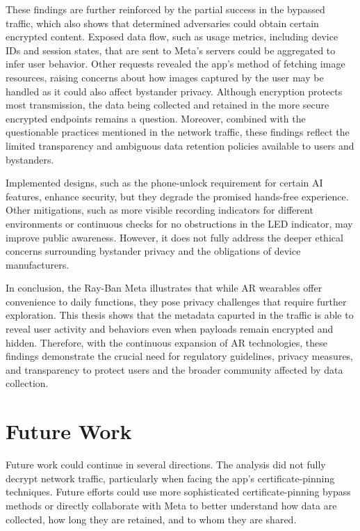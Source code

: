 These findings are further reinforced by the partial success in the bypassed traffic, which also shows that determined adversaries could obtain certain encrypted content. Exposed data flow, such as usage metrics, including device IDs and session states, that are sent to Meta's servers could be aggregated to infer user behavior. Other requests revealed the app's method of fetching image resources, raising concerns about how images captured by the user may be handled as it could also affect bystander privacy. Although encryption protects most transmission, the data being collected and retained in the more secure encrypted endpoints remains a question. Moreover, combined with the questionable practices mentioned in the network traffic, these findings reflect the limited transparency and ambiguous data retention policies available to users and bystanders. 


Implemented designs, such as the phone-unlock requirement for certain AI features, enhance security, but they degrade the promised hands-free experience. Other mitigations, such as more visible recording indicators for different environments or continuous checks for no obstructions in the LED indicator, may improve public awareness. However, it does not fully address the deeper ethical concerns surrounding bystander privacy and the obligations of device manufacturers.

In conclusion, the Ray-Ban Meta illustrates that while AR wearables offer convenience to daily functions, they pose privacy challenges that require further exploration. This thesis shows that the metadata capurted in the traffic is able to reveal user activity and behaviors even when payloads remain encrypted and hidden. Therefore, with the continuous expansion of AR technologies, these findings demonstrate the crucial need for regulatory guidelines, privacy measures, and transparency to protect users and the broader community affected by data collection.


\section*{Future Work}
Future work could continue in several directions. The analysis did not fully decrypt network traffic, particularly when facing the app's certificate-pinning techniques. Future efforts could use more sophisticated certificate-pinning bypass methods or directly collaborate with Meta to better understand how data are collected, how long they are retained, and to whom they are shared. 

